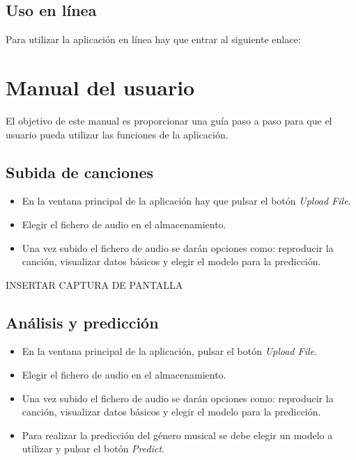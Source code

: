 \subsection{Uso en línea}

Para utilizar la aplicación en línea hay que entrar al siguiente enlace: 

\section{Manual del usuario}
El objetivo de este manual es proporcionar una guía paso a paso para que el usuario pueda utilizar las funciones de la aplicación.

\subsection{Subida de canciones}
\begin{itemize}
\tightlist

\item En la ventana principal de la aplicación hay que pulsar el botón \textit{Upload File}.
\item Elegir el fichero de audio en el almacenamiento.
\item Una vez subido el fichero de audio se darán opciones como: reproducir la canción, visualizar datos básicos y elegir el modelo para la predicción.

\end{itemize}

INSERTAR CAPTURA DE PANTALLA

\subsection{Análisis y predicción}

\begin{itemize}
\tightlist

\item En la ventana principal de la aplicación, pulsar el botón \textit{Upload File}.
\item Elegir el fichero de audio en el almacenamiento.
\item Una vez subido el fichero de audio se darán opciones como: reproducir la canción, visualizar datos básicos y elegir el modelo para la predicción.
\item Para realizar la predicción del género musical se debe elegir un modelo a utilizar y pulsar el botón \textit{Predict}.

\end{itemize}

